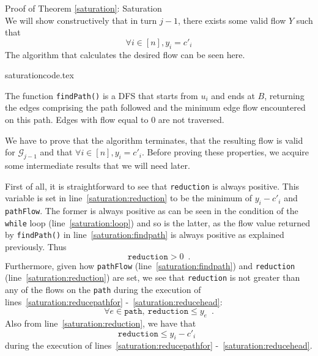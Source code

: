 \begin{sepproof}{Proof of Theorem \ref{saturation}: Saturation} \ \\
  We will show constructively that in turn $j-1$, there exists some valid flow $Y$ such that
  \begin{equation}
  \label{saturation:target}
    \forall i \in [n], y_i = c'_i
  \end{equation}
  The algorithm that calculates the desired flow can be seen here.

  {saturationcode.tex}

  The function \texttt{findPath()} is a DFS that starts from $u_i$ and ends at $B$, returning the edges comprising the path
  followed and the minimum edge flow encountered on this path. Edges with flow equal to 0 are not traversed.

  We have to prove that the algorithm terminates, that the resulting flow is valid for $\mathcal{G}_{j-1}$ and that $\forall i
  \in [n], y_i = c'_i$. Before proving these properties, we acquire some intermediate results that we will need later.
  
  First of all, it is straightforward to see that \texttt{reduction} is always positive. This variable is set in
  line~\ref{saturation:reduction} to be the minimum of $y_i - c'_i$ and \texttt{pathFlow}. The former is always positive
  as can be seen in the condition of the \texttt{while} loop (line~\ref{saturation:loop}) and so is the latter, as the flow
  value returned by \texttt{findPath()} in line~\ref{saturation:findpath} is always positive as explained previously. Thus
  \begin{equation}
  \label{reductionpos}
    \texttt{reduction} > 0 \enspace.
  \end{equation}
  Furthermore, given how \texttt{pathFlow} (line~\ref{saturation:findpath}) and \texttt{reduction}
  (line~\ref{saturation:reduction}) are set, we see that \texttt{reduction} is not greater than any of the flows on the
  \texttt{path} during the execution of lines~\ref{saturation:reducepathfor} -~\ref{saturation:reducehead}:
  \begin{equation}
  \label{reductionsmalle}
    \forall e \in \texttt{path}, \: \texttt{reduction} \leq y_e \enspace.
  \end{equation}
  Also from line~\ref{saturation:reduction}, we have that
  \begin{equation}
  \label{reductionsmalli}
    \texttt{reduction} \leq y_i - c'_i \enspace
  \end{equation}
  during the execution of lines~\ref{saturation:reducepathfor} -~\ref{saturation:reducehead}.


\end{sepproof}

